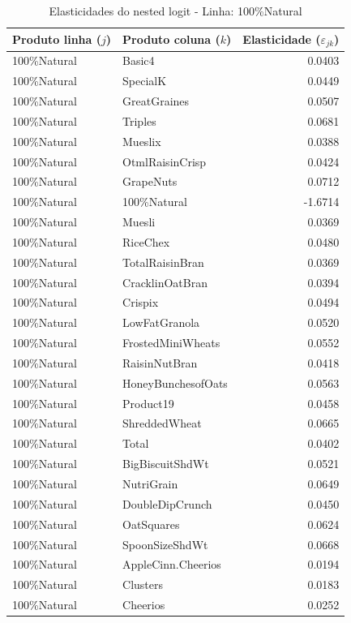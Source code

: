 \begingroup
\begin{table}[H]
\centering
\caption{Elasticidades do nested logit - Linha: 100\%Natural}
\label{tab:elas-nested-100pctnatural}
\small
\begin{tabular}{llr}
\toprule
Produto linha ($j$) & Produto coluna ($k$) & Elasticidade ($\varepsilon_{jk}$) \\
\midrule
100\%Natural & Basic4 & 0.0403 \\
100\%Natural & SpecialK & 0.0449 \\
100\%Natural & GreatGraines & 0.0507 \\
100\%Natural & Triples & 0.0681 \\
100\%Natural & Mueslix & 0.0388 \\
100\%Natural & OtmlRaisinCrisp & 0.0424 \\
100\%Natural & GrapeNuts & 0.0712 \\
100\%Natural & 100\%Natural & -1.6714 \\
100\%Natural & Muesli & 0.0369 \\
100\%Natural & RiceChex & 0.0480 \\
100\%Natural & TotalRaisinBran & 0.0369 \\
100\%Natural & CracklinOatBran & 0.0394 \\
100\%Natural & Crispix & 0.0494 \\
100\%Natural & LowFatGranola & 0.0520 \\
100\%Natural & FrostedMiniWheats & 0.0552 \\
100\%Natural & RaisinNutBran & 0.0418 \\
100\%Natural & HoneyBunchesofOats & 0.0563 \\
100\%Natural & Product19 & 0.0458 \\
100\%Natural & ShreddedWheat & 0.0665 \\
100\%Natural & Total & 0.0402 \\
100\%Natural & BigBiscuitShdWt & 0.0521 \\
100\%Natural & NutriGrain & 0.0649 \\
100\%Natural & DoubleDipCrunch & 0.0450 \\
100\%Natural & OatSquares & 0.0624 \\
100\%Natural & SpoonSizeShdWt & 0.0668 \\
100\%Natural & AppleCinn.Cheerios & 0.0194 \\
100\%Natural & Clusters & 0.0183 \\
100\%Natural & Cheerios & 0.0252 \\

\end{tabular}
\end{table}
